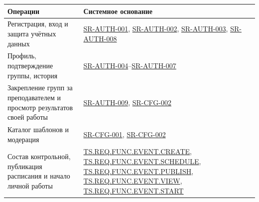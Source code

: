 \documentclass[12pt,a4paper]{article}
\newcounter{none} %
\begin{document}
{\def\LTcaptype{none} %
\begin{longtable}[]{@{}
  >{\raggedright\arraybackslash}p{}
  >{\raggedright\arraybackslash}p{}@{}}
\toprule\noalign{}
\begin{minipage}[b]{\linewidth}\raggedright
Операции
\end{minipage} & \begin{minipage}[b]{\linewidth}\raggedright
Системное основание
\end{minipage} \\
\midrule\noalign{}
\endhead
\bottomrule\noalign{}
\endlastfoot
Регистрация, вход и защита учётных данных & {\href{../04\_Системные\_требования/DOC-05\_Системные\_требования.pdf\#sr-auth-001}{SR-AUTH-001}}, {\href{../04\_Системные\_требования/DOC-05\_Системные\_требования.pdf\#sr-auth-002}{SR-AUTH-002}}, {\href{../04\_Системные\_требования/DOC-05\_Системные\_требования.pdf\#sr-auth-003}{SR-AUTH-003}}, {\href{../04\_Системные\_требования/DOC-05\_Системные\_требования.pdf\#sr-auth-008}{SR-AUTH-008}} \\
Профиль, подтверждение группы, история & {\href{../04\_Системные\_требования/DOC-05\_Системные\_требования.pdf\#sr-auth-004}{SR-AUTH-004}}--{\href{../04\_Системные\_требования/DOC-05\_Системные\_требования.pdf\#sr-auth-007}{SR-AUTH-007}} \\
Закрепление групп за преподавателем и просмотр результатов своей работы & {\href{../04\_Системные\_требования/DOC-05\_Системные\_требования.pdf\#sr-auth-009}{SR-AUTH-009}}, {\href{../04\_Системные\_требования/DOC-05\_Системные\_требования.pdf\#sr-cfg-002}{SR-CFG-002}} \\
Каталог шаблонов и модерация & {\href{../04\_Системные\_требования/DOC-05\_Системные\_требования.pdf\#sr-cfg-001}{SR-CFG-001}}, {\href{../04\_Системные\_требования/DOC-05\_Системные\_требования.pdf\#sr-cfg-002}{SR-CFG-002}} \\
Состав контрольной, публикация расписания и начало личной работы & {\href{../02\_Техническое\_задание/DOC-02\_Техническое\_задание.pdf\#ts-req-func-event-create}{TS.REQ.FUNC.EVENT.CREATE}}, {\href{../02\_Техническое\_задание/DOC-02\_Техническое\_задание.pdf\#ts-req-func-event-schedule}{TS.REQ.FUNC.EVENT.SCHEDULE}}, {\href{../02\_Техническое\_задание/DOC-02\_Техническое\_задание.pdf\#ts-req-func-event-publish}{TS.REQ.FUNC.EVENT.PUBLISH}}, {\href{../02\_Техническое\_задание/DOC-02\_Техническое\_задание.pdf\#ts-req-func-event-view}{TS.REQ.FUNC.EVENT.VIEW}}, {\href{../02\_Техническое\_задание/DOC-02\_Техническое\_задание.pdf\#ts-req-func-event-start}{TS.REQ.FUNC.EVENT.START}} \\

\end{longtable}}
\end{document}

